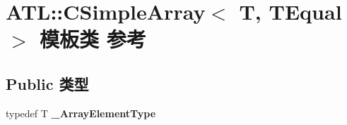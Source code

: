 \hypertarget{class_a_t_l_1_1_c_simple_array}{}\section{A\+TL\+:\+:C\+Simple\+Array$<$ T, T\+Equal $>$ 模板类 参考}
\label{class_a_t_l_1_1_c_simple_array}
\subsection*{Public 类型}
\begin{DoxyCompactItemize}
\item 
\mbox{\label{class_a_t_l_1_1_c_simple_array_a42bdd2a1f5770f014ee494d7d282f542}} 
typedef T {\bfseries \+\_\+\+Array\+Element\+Type}
\end{DoxyCompactItemize}
